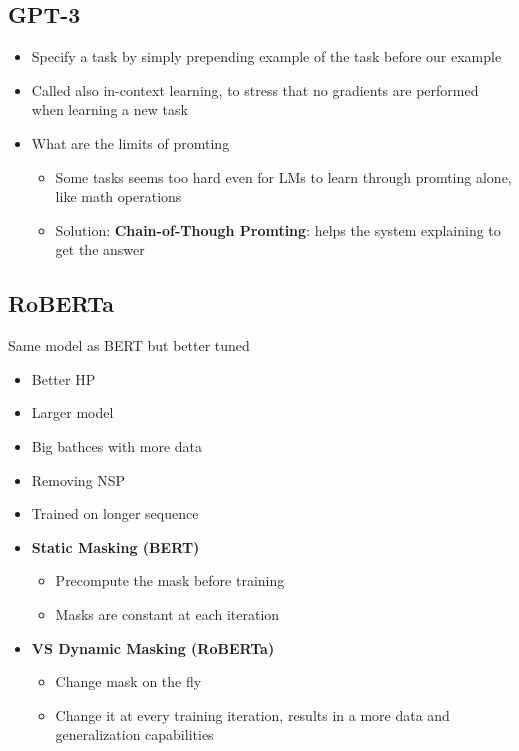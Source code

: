 \subsection{GPT-3}
\begin{itemize}
    \item Specify a task by simply prepending example of the task before our example
    \item Called also in-context learning, to stress that no gradients are performed when learning a new task
    \item What are the limits of promting
    \begin{itemize}
        \item Some tasks seems too hard even for LMs to learn through promting alone, like math operations
        \item Solution: \textbf{Chain-of-Though Promting}: helps the system explaining to get the answer
    \end{itemize}
\end{itemize}
\subsection{RoBERTa}
Same model as BERT but better tuned
\begin{itemize}
    \item Better HP
    \item Larger model
    \item Big bathces with more data
    \item Removing NSP
    \item Trained on longer sequence
    \item \textbf{Static Masking (BERT)}
    \begin{itemize}
        \item Precompute the mask before training
        \item Masks are constant at each iteration
    \end{itemize}
    \item \textbf{VS Dynamic Masking (RoBERTa)}
    \begin{itemize}
        \item Change mask on the fly
        \item Change it at every training iteration, results in a more data and generalization capabilities
    \end{itemize}
\end{itemize}
